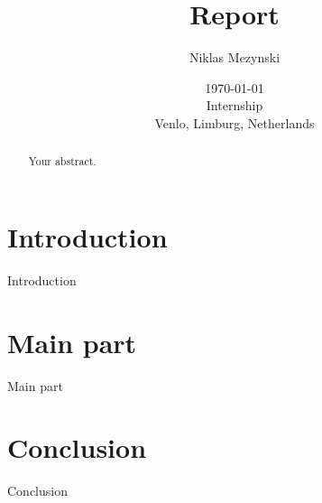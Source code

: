 \documentclass[]{report}
\title{Report}
\author{Niklas Mezynski}
\date{\today \\Internship \\Venlo, Limburg, Netherlands}
\begin{document}
\maketitle

\begin{abstract}
    Your abstract.
\end{abstract}


\tableofcontents
\newpage

\listoffigures
\newpage

\listoftables
\newpage

\printnoidxglossaries
\cleardoublepage
{}

\section{Introduction}
Introduction

\section{Main part}
Main part

\section{Conclusion}
Conclusion

\printbibliography[title=References]
\end{document}

